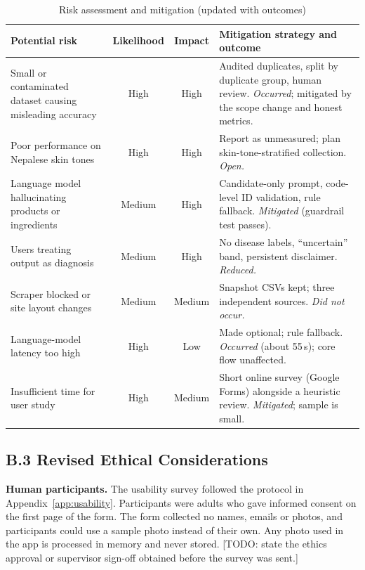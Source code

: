 \begin{table}[ht]
\centering\small
\caption{Risk assessment and mitigation (updated with outcomes)}
\label{tab:risks}
\begin{tabularx}{\linewidth}{P{3.2cm}ccY}
\toprule
\textbf{Potential risk} & \textbf{Likelihood} & \textbf{Impact} & \textbf{Mitigation strategy and outcome}\\
\midrule
Small or contaminated dataset causing misleading accuracy & High & High & Audited duplicates, split by duplicate group, human review. \emph{Occurred}; mitigated by the scope change and honest metrics.\\
Poor performance on Nepalese skin tones & High & High & Report as unmeasured; plan skin-tone-stratified collection. \emph{Open.}\\
Language model hallucinating products or ingredients & Medium & High & Candidate-only prompt, code-level ID validation, rule fallback. \emph{Mitigated} (guardrail test passes).\\
Users treating output as diagnosis & Medium & High & No disease labels, ``uncertain'' band, persistent disclaimer. \emph{Reduced.}\\
Scraper blocked or site layout changes & Medium & Medium & Snapshot CSVs kept; three independent sources. \emph{Did not occur.}\\
Language-model latency too high & High & Low & Made optional; rule fallback. \emph{Occurred} (about 55\,s); core flow unaffected.\\
Insufficient time for user study & High & Medium & Short online survey (Google Forms) alongside a heuristic review. \emph{Mitigated}; sample is small.\\
\bottomrule
\end{tabularx}
\end{table}

\subsection*{B.3 Revised Ethical Considerations}

\textbf{Human participants.} The usability survey followed the protocol in Appendix~\ref{app:usability}. Participants were adults who gave informed consent on the first page of the form. The form collected no names, emails or photos, and participants could use a sample photo instead of their own. Any photo used in the app is processed in memory and never stored. [TODO: state the ethics approval or supervisor sign-off obtained before the survey was sent.]


